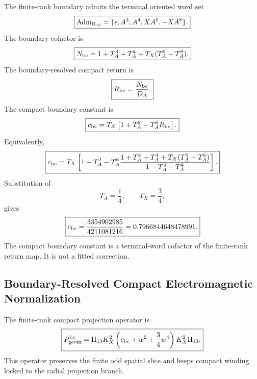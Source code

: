 \documentclass[11pt]{article}
\begin{document}
The finite-rank boundary admits the terminal oriented word set
\begin{equation}
\boxed{
{\rm Adm}_{\Pi_{13}}
=
\{\epsilon,A^3,A^4,XA^5,-XA^8\}.
}
\end{equation}
The boundary cofactor is
\begin{equation}
\boxed{
N_{\rm bc}
=
1+T_A^3+T_A^4+T_X(T_A^5-T_A^8).
}
\end{equation}
The boundary-resolved compact return is
\begin{equation}
\boxed{
R_{\rm bc}
=
\frac{N_{\rm bc}}{D_A}.
}
\end{equation}
The compact boundary constant is
\begin{equation}
\boxed{
c_{\rm bc}
=
T_X
\left[
1+T_A^2-T_A^6R_{\rm bc}
\right].
}
\end{equation}
Equivalently,
\begin{equation}
\boxed{
c_{\rm bc}
=
T_X
\left[
1+T_A^2
-
T_A^6
\frac{
1+T_A^3+T_A^4+T_X(T_A^5-T_A^8)
}{
1-T_A^3-T_A^4
}
\right].
}
\end{equation}
Substitution of
\begin{equation}
T_A=\frac14,
\qquad
T_X=\frac34,
\end{equation}
gives
\begin{equation}
\boxed{
c_{\rm bc}
=
\frac{3354902985}{4211081216}
=
0.7966844648478991.
}
\end{equation}
The compact boundary constant is a terminal-word cofactor of the finite-rank
return map. It is not a fitted correction.

\subsection{Boundary-Resolved Compact Electromagnetic Normalization}

The finite-rank compact projection operator is
\begin{equation}
\boxed{
P_{\rm geom}^{\rm bc}
=
\Pi_{13}K_X^2
\left(
c_{\rm bc}
+
w^2
+
\frac34w^4
\right)
K_X^2\Pi_{13}.
}
\end{equation}
This operator preserves the finite odd spatial slice and keeps compact winding
locked to the radial projection branch.
\end{document}
